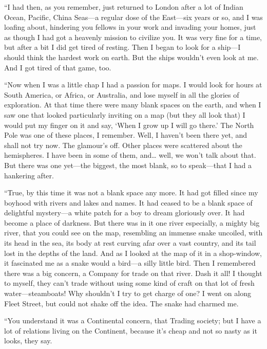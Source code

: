 \documentclass[12pt]{report}
\begin{document}
``I had then, as you remember, just returned to London after a lot of
Indian Ocean, Pacific, China Seas---a regular dose of the East---six
years or so, and I was loafing about, hindering you fellows in your work
and invading your homes, just as though I had got a heavenly mission to
civilize you. It was very fine for a time, but after a bit I did get
tired of resting. Then I began to look for a ship---I should think the
hardest work on earth. But the ships wouldn't even look at me. And I got
tired of that game, too.

``Now when I was a little chap I had a passion for maps. I would look
for hours at South America, or Africa, or Australia, and lose myself in
all the glories of exploration. At that time there were many blank
spaces on the earth, and when I saw one that looked particularly
inviting on a map (but they all look that) I would put my finger on it
and say, `When I grow up I will go there.' The North Pole was one of
these places, I remember. Well, I haven't been there yet, and shall not
try now. The glamour's off. Other places were scattered about the
hemispheres. I have been in some of them, and\ldots{} well, we won't
talk about that. But there was one yet---the biggest, the most blank, so
to speak---that I had a hankering after.

``True, by this time it was not a blank space any more. It had got
filled since my boyhood with rivers and lakes and names. It had ceased
to be a blank space of delightful mystery---a white patch for a boy to
dream gloriously over. It had become a place of darkness. But there was
in it one river especially, a mighty big river, that you could see on
the map, resembling an immense snake uncoiled, with its head in the sea,
its body at rest curving afar over a vast country, and its tail lost in
the depths of the land. And as I looked at the map of it in a
shop-window, it fascinated me as a snake would a bird---a silly little
bird. Then I remembered there was a big concern, a Company for trade on
that river. Dash it all! I thought to myself, they can't trade without
using some kind of craft on that lot of fresh water---steamboats! Why
shouldn't I try to get charge of one? I went on along Fleet Street, but
could not shake off the idea. The snake had charmed me.

``You understand it was a Continental concern, that Trading society; but
I have a lot of relations living on the Continent, because it's cheap
and not so nasty as it looks, they say.
\end{document}
